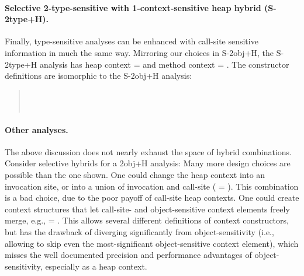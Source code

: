 

\paragraph{Selective 2-type-sensitive with 1-context-sensitive heap hybrid (S-2type+H).}

Finally, type-sensitive analyses can be enhanced with call-site
sensitive information in much the same way.  Mirroring our choices in
S-2obj+H, the S-2type+H analysis has heap context  = 
and method context  = .
The constructor definitions are isomorphic to the S-2obj+H analysis:
\begin{quote}
 \\
 \\
\end{quote}

\paragraph{Other analyses.}
The above discussion does not nearly exhaust the space of hybrid
combinations. Consider selective hybrids for a 2obj+H analysis: Many
more design choices are possible than the one shown. One could change
the heap context into an invocation site, or into a union of
invocation and call-site ( = ). This
combination is a bad choice, due to the poor payoff of call-site heap
contexts. One could create context structures that let call-site- and
object-sensitive context elements freely merge, e.g.,  =
.  This allows several different definitions of context
constructors, but has the drawback of diverging significantly from
object-sensitivity (i.e., allowing to skip even the most-significant
object-sensitive context element), which misses the well documented
precision and performance advantages of object-sensitivity, especially
as a heap context.


